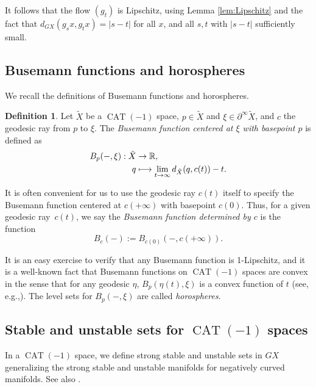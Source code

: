 \documentclass[11pt]{article}
\newcommand{\eg}{e.g.,\xspace}
\def\mto{\mathchoice{\longmapsto}{\mapsto}{\mapsto}{\mapsto}}
\theoremstyle{definition}
\newtheorem{defn}[thm]{Definition}
\numberwithin{equation}{section}
\DeclareMathOperator{\CAT}{CAT}
\begin{document}
It follows that the flow $(g_t)$ is Lipschitz, using Lemma \ref{lem:Lipschitz} and the fact that $d_{GX}(g_sx, g_tx) = |s-t|$ for all $x$, and all $s, t$ with $|s-t|$ sufficiently small.

\subsection{Busemann functions and horospheres}

We recall the definitions of Busemann functions and horospheres.

\begin{defn}
Let $\tilde X$ be a $\CAT(-1)$ space, $p\in \tilde X$ and $\xi\in \partial^\infty\tilde X$, and $c$ the geodesic ray from $p$ to $\xi$. The \emph{Busemann function centered at $\xi$ with basepoint $p$} is defined as
\begin{align*}
B_p(-,\xi): \tilde X &\to \mathbb{R},\\
q &\mto \lim_{t\to\infty} d_{\tilde X}(q,c(t))-t.
\end{align*}
\end{defn}

It is often convenient for us to use the geodesic ray $c(t)$ itself to specify the Busemann function centered at $c(+\infty)$ with basepoint $c(0)$. Thus, for a given geodesic ray~$c(t)$, we say the \emph{Busemann function determined by $c$} is the function
\[
B_c(-):= B_{c(0)} (-, c(+\infty)).
\]

It is an easy exercise to verify that any Busemann function is 1-Lipschitz, and it is a well-known fact that Busemann functions on $\CAT(-1)$ spaces are convex in the sense that for any geodesic $\eta$, $B_p(\eta(t),\xi)$ is a convex function of $t$ (see, \eg \cite[Prop.\,II.8.22]{bh}). The level sets for $B_p(-,\xi)$ are called \emph{horospheres}.

\subsection{Stable and unstable sets for $\CAT(-1)$ spaces}

In a $\CAT(-1)$ space, we define strong stable and unstable sets in $G X$ generalizing the strong stable and unstable manifolds for negatively curved manifolds. See also \cite[\S2.8]{mB95}.
\end{document}
